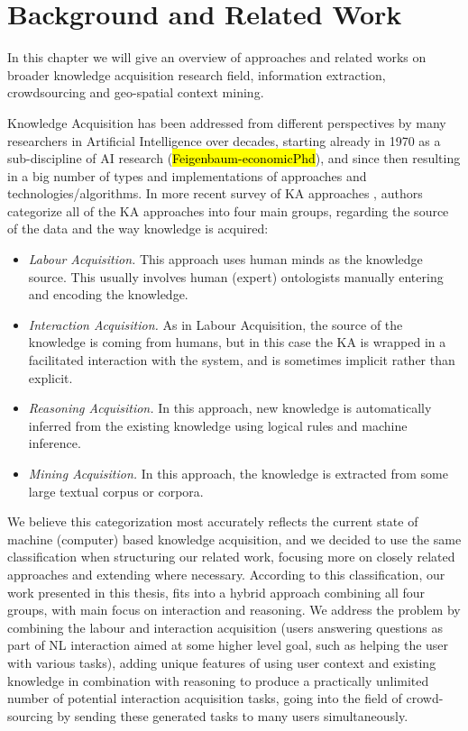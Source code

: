 \chapter{Background and Related Work}

In this chapter we will give an overview of approaches and related works on broader knowledge acquisition research field, information extraction, crowdsourcing and geo-spatial context mining. 

Knowledge Acquisition has been addressed from different perspectives by many researchers in Artificial Intelligence over decades, starting already in 1970 as a sub-discipline of AI research (\hl{Feigenbaum-economicPhd}), and since then resulting in a big number of types and implementations of approaches and technologies/algorithms. In more recent survey of KA approaches \parencite{Zang2013}, authors categorize all of the KA approaches into four main groups, regarding the source of the data and the way knowledge is acquired:
\begin{itemize}
	\item \emph{Labour Acquisition.} This approach uses human minds as the knowledge source. This usually involves human (expert) ontologists manually entering and encoding the knowledge.
	\item \emph{Interaction Acquisition.} As in Labour Acquisition, the source of the knowledge is coming from humans, but in this case the KA is wrapped in a facilitated interaction with the system, and is sometimes implicit rather than explicit.
	\item \emph{Reasoning Acquisition.} In this approach, new knowledge is automatically inferred from the existing knowledge using logical rules and machine inference.
	\item \emph{Mining Acquisition.} In this approach, the knowledge is extracted from some large textual corpus or corpora.
\end{itemize}

We believe this categorization most accurately reflects the current state of machine (computer) based knowledge acquisition, and we decided to use the same classification when structuring our related work, focusing more on closely related approaches and extending where necessary. According to this classification, our work presented in this thesis, fits into a hybrid approach combining all four groups, with main focus on interaction and reasoning. We address the problem by combining the labour and interaction acquisition (users answering questions as part of NL interaction aimed at some higher level goal, such as helping the user with various tasks), adding unique features of using user context and existing knowledge in combination with reasoning to produce a practically unlimited number of potential interaction acquisition tasks, going into the field of crowd-sourcing by sending these generated tasks to many users simultaneously.

